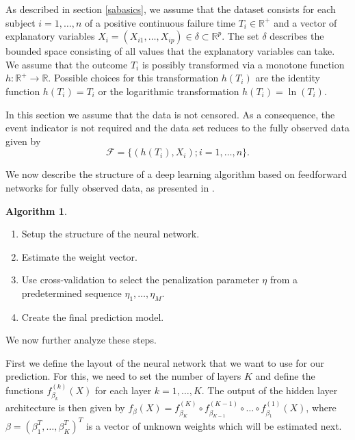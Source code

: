 \documentclass[12pt, a4paper]{article}
\theoremstyle{definition}
\newtheorem{Algorithm}{Algorithm}[section]
\theoremstyle{plain}
\numberwithin{equation}{section}
\numberwithin{figure}{section}
\numberwithin{table}{section}
\begin{document}
	As described in section \ref{sabasics}, we assume that the dataset consists for each subject $i = 1,\dots,n$ of a positive continuous failure time $T_i \in \mathbb{R}^+$ and a vector of explanatory variables $X_i = (X_{i1}, \dots , X_{ip}) \in \delta \subset \mathbb{R}^p$.
	The set $\delta$ describes the bounded space consisting of all values that the explanatory variables can take.
	We assume that the outcome $T_i$ is possibly transformed via a monotone function $h: \mathbb{R}^+ \rightarrow \mathbb{R}$.
	Possible choices for this transformation $h(T_i)$ are the identity function $h(T_i)=T_i$ or the logarithmic transformation $h(T_i)= \ln (T_i)$.
	
	In this section we assume that the data is not censored.
	As a consequence, the event indicator is not required and the data set reduces to the fully observed data given by
	\begin{equation*}
	\mathcal{F} =\{ \left( h(T_i), X_i\right); i = 1, \dots, n\}.
	\end{equation*}
	
	We now describe the structure of a deep learning algorithm based on feedforward networks for fully observed data, as presented in \citet*{basearticle}.
	
	\begin{Algorithm}\label{alg:nocensor}
		~
	\begin{enumerate}
		\item Setup the structure of the neural network.
		\item Estimate the weight vector.
		\item Use cross-validation to select the penalization parameter $\eta$ from a predetermined sequence $\eta_1,\dots,\eta_M$.
		\item Create the final prediction model.
	\end{enumerate}
	\end{Algorithm}

	We now further analyze these steps.

	First we define the layout of the neural network that we want to use for our prediction.
	For this, we need to set the number of layers $K$ and define the functions $f_{\beta_k}^{(k)}(X)$ for each layer $k = 1, \dots, K$.
	The output of the hidden layer architecture is then given by $f_{\beta}(X) = f_{\beta_K}^{(K)} \circ f_{\beta_{K-1}}^{(K-1)} \circ \dots \circ f_{\beta_1}^{(1)}(X)$, where $\beta = (\beta_1^T, \dots, \beta_K^T)^T$ is a vector of unknown weights which will be estimated next.
	
\end{document}
